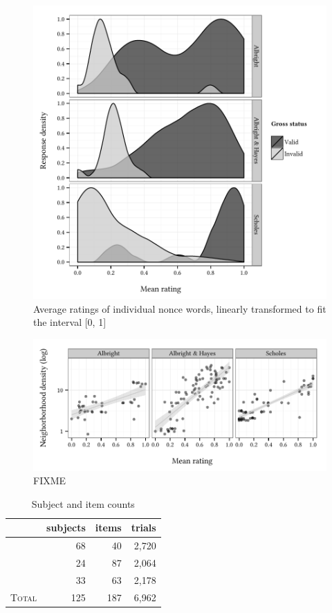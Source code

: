 \begin{figure}
\centering
\includegraphics{density.pdf}
\caption{Average ratings of individual nonce words, linearly transformed to fit the interval [0, 1]}
\label{dsn}
\end{figure}

\begin{figure}
\centering
\includegraphics{neighborhood.pdf}
\caption{FIXME}
\label{neighborhood}
\end{figure}

\begin{table}
\centering
\begin{tabular}{l rrr}
\toprule
                        & subjects & items & trials \\
\midrule
\citealt{Albright2007}  & 68       & 40    & 2,720  \\
\citealt{Albright2003a} & 24       & 87    & 2,064  \\
\citealt{Scholes1966}   & 33       & 63    & 2,178  \\
\midrule
\textsc{Total}          & 125      & 187   & 6,962  \\
\bottomrule
\end{tabular}
\caption{Subject and item counts}
\label{counts}
\end{table}

